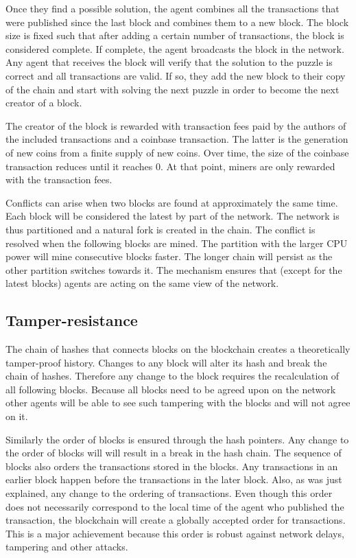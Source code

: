 Once they find a possible solution, the agent combines all the transactions that were published since the last
block and combines them to a new block. The block size is fixed such that after adding a certain number of 
transactions, the block is considered complete. If complete, the agent broadcasts the
block in the network. Any agent that receives the block will verify that
the solution to the puzzle is correct and all transactions are valid. If so, they add the new block
to their copy of the chain and start with solving the next puzzle in order to become the next 
creator of a block. 

The creator of the block is rewarded with transaction fees paid by the authors
of the included transactions and a coinbase transaction. The latter is the generation of new 
coins from a finite supply of new coins. Over time, the size of the coinbase transaction reduces 
until it reaches 0. At that point, miners are only rewarded with the transaction fees.

Conflicts can arise when two blocks are found at approximately the same time. Each block will be 
considered the latest by part of the network. The network is thus partitioned and a natural
fork is created in the chain. The conflict is resolved when the following blocks are mined. 
The partition with the larger CPU power will mine consecutive blocks faster. The longer
chain will persist as the other partition switches towards it. The mechanism ensures that (except for
the latest blocks) agents are acting on the same view of the network.

\subsection{Tamper-resistance}
The chain of hashes that connects blocks on the blockchain creates a theoretically tamper-proof history.  
Changes to any block will alter its hash and break the chain of hashes. Therefore any change to the 
block requires the recalculation of all following blocks. Because all blocks need to be agreed upon on the network 
other agents will be able to see such tampering with the blocks and will not agree on it. 

Similarly the order of blocks is ensured through the hash pointers. Any change to the order of blocks
will will result in a break in the hash chain.
The sequence of blocks also orders the transactions stored in the blocks. 
Any transactions in an earlier block happen before the transactions in the later block. Also, as was just 
explained, any change to the ordering of transactions. Even though this order
does not necessarily correspond to the local time of the agent who published the transaction, the 
blockchain will create a globally accepted order for transactions.  This is a major 
achievement because this order is robust against network delays, tampering and other attacks.

